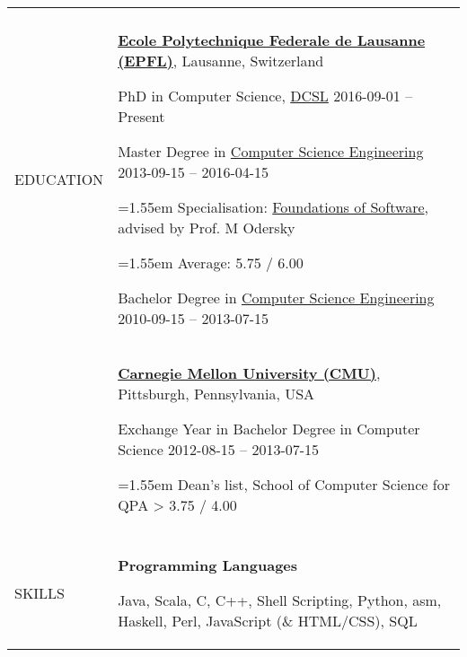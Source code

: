 \documentclass[a4paper,10pt,oneside]{article}
\newcommand{\BulletSymbol}{{\char"2022}}
\newcommand{\LongMonth}[1]{%
\ifcase#1\relax
\or January%
\or February%
\or March%
\or April%
\or May%
\or June%
\or July%
\or August%
\or September%
\or October%
\or November%
\or December%
\fi}
\newcommand{\ShortMonth}[1]{%
\ifcase#1\relax
\or Jan%
\or Feb%
\or Mar%
\or Apr%
\or May%
\or Jun%
\or Jul%
\or Aug%
\or Sep%
\or Oct%
\or Nov%
\or Dec%
\fi}
\newcommand{\DatestampYMD}[3]{\mbox{#1-#2-#3}}
\newcommand{\DatestampYMD}[3]{\mbox{\ShortMonth{#2} #1}}
\newcommand{\DatestampYMD}[3]{\mbox{\LongMonth{#2} #1}}
\newcommand{\DatestampYMD}[3]{#1}
\newenvironment{body}
{\par\vspace{-1em}\par
\begin{longtable}{p{0.15\textwidth}p{0.80\textwidth}}}
{\par\end{longtable}\par}
\renewcommand{\section}[3]{\\[-1em]\pdfbookmark[2]{#2}{#3}\\%
{\fontsize{9pt}{11pt}\selectfont\bfseries\raggedright%
\MakeUppercase{#1}}&}
\newcommand{\EntryGap}{\\[-0.5em]~&}
\newcommand{\SmallEntryGap}{\par\vspace{0.25em}\par}
\newenvironment{detail}
{\par\begingroup\fontsize{8.6}{10.3}\selectfont}
{\par\endgroup\par}
\newenvironment{skilling}
{\par\begingroup\fontsize{8.6}{10.3}\selectfont}
{\par\endgroup\par}
\newcommand{\BulletItem}{\par%
\noindent\hangafter=1\hangindent=1.55em\ignorespaces%
\hspace{0.8em}\BulletSymbol\hspace{0.4em}\ignorespaces}
\begin{document}
\begin{body}


\section
{Education}
{Education}
{PDF:Education}

\href{https://www.epfl.ch/}
{\textbf{Ecole Polytechnique Federale de Lausanne (EPFL)}},
Lausanne, Switzerland
\SmallEntryGap
PhD in Computer Science, \href{http://dcsl.epfl.ch/}{DCSL}
\hfill
\DatestampYMD{2016}{09}{01} --
Present

\SmallEntryGap
Master Degree in
\href{http://ic.epfl.ch/computer-science/master}
{Computer Science Engineering}
\hfill
\DatestampYMD{2013}{09}{15} --
\DatestampYMD{2016}{04}{15}
\begin{detail}
\BulletItem
Specialisation:
\href{http://ic.epfl.ch/specializations}
{Foundations of Software}, advised by Prof. M Odersky
\BulletItem
Average:
5.75 / 6.00
\end{detail}

\SmallEntryGap
Bachelor Degree in
\href{http://ic.epfl.ch/computer-science/bachelor}
{Computer Science Engineering}
\hfill
\DatestampYMD{2010}{09}{15} --
\DatestampYMD{2013}{07}{15}

\EntryGap
\href{http://www.cmu.edu/}
{\textbf{Carnegie Mellon University (CMU)}},
Pittsburgh, Pennsylvania, USA
\par
Exchange Year in Bachelor Degree in Computer Science
\hfill
\DatestampYMD{2012}{08}{15} --
\DatestampYMD{2013}{07}{15}
\begin{detail}
\BulletItem
Dean's list, School of Computer Science for QPA > 3.75 / 4.00
\end{detail}

\hline


\section
{Skills}
{Skills}
{PDF:Skills}

\textbf{Programming Languages}
\par
\begin{skilling}
Java, 
Scala,
C, 
C++, 
Shell Scripting,
Python, 
asm,
Haskell,
Perl,
JavaScript (\& HTML/CSS),
SQL
\end{skilling}


\end{body}
\end{document}
